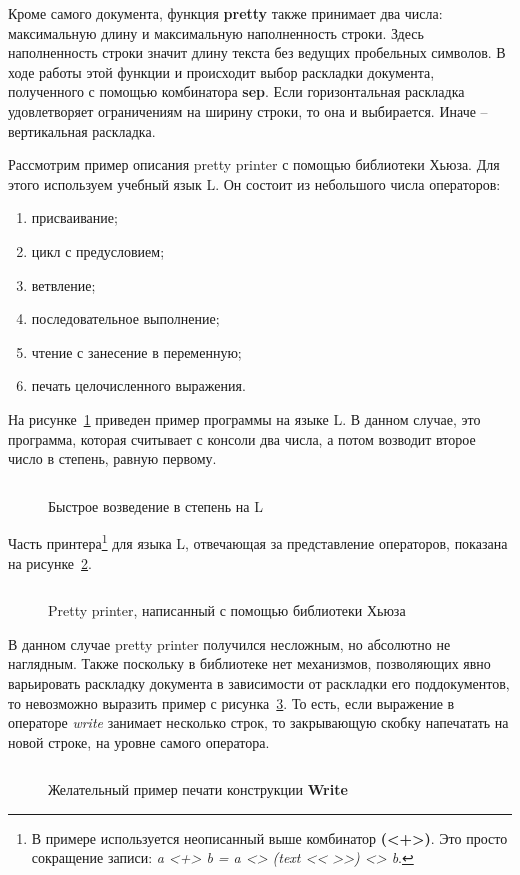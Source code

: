 \inputminted{haskell}{codes/hughesPretty.hs}

Кроме самого документа, функция \textbf{pretty} также принимает два числа: максимальную длину и максимальную наполненность строки. Здесь наполненность строки значит длину текста без ведущих пробельных символов. В ходе работы этой функции и происходит выбор раскладки документа, полученного с помощью комбинатора \textbf{sep}. Если горизонтальная раскладка удовлетворяет ограничениям на ширину строки, то она и выбирается. Иначе -- вертикальная раскладка.



Рассмотрим пример описания pretty printer с помощью библиотеки Хьюза. Для этого используем учебный язык L. Он состоит из небольшого числа операторов:
\begin{enumerate}
\item присваивание;
\item цикл с предусловием;
\item ветвление;
\item последовательное выполнение;
\item чтение с занесение в переменную;
\item печать целочисленного выражения.
\end{enumerate}

На рисунке~\ref{fig:lEx} приведен пример программы на языке L. В данном случае, это программа, которая считывает с консоли два числа, а потом возводит второе число в степень, равную первому.

\begin{figure}[h!]
	\centering
	\inputminted{pascal}{codes/lEx.l}
	\caption{Быстрое возведение в степень на L}
	\label{fig:lEx}
\end{figure}

Часть принтера\footnote{
В примере используется неописанный выше комбинатор \textbf{(<+>)}. Это просто сокращение записи: \textit{a <+> b = a <> (text << >>) <> b}.
} для языка L, отвечающая за представление операторов, показана на рисунке~\ref{fig:lHughesPrinter}.
\begin{figure}[h!]
	\inputminted{haskell}{codes/lHughesPrinter.hs}
	\caption{Pretty printer, написанный с помощью библиотеки Хьюза}
	\label{fig:lHughesPrinter}
\end{figure}

В данном случае pretty printer получился несложным, но абсолютно не наглядным. Также поскольку в библиотеке нет механизмов, позволяющих явно варьировать раскладку документа в зависимости от раскладки его поддокументов, то невозможно выразить пример с рисунка~\ref{fig:lGoodWriteEx}. То есть, если выражение в операторе \textit{write} занимает несколько строк, то закрывающую скобку напечатать на новой строке, на уровне самого оператора.
\begin{figure}[h!]
	\inputminted{pascal}{codes/lGoodWriteEx.l}
	\caption{Желательный пример печати конструкции \textbf{Write}}
	\label{fig:lGoodWriteEx}
\end{figure}

